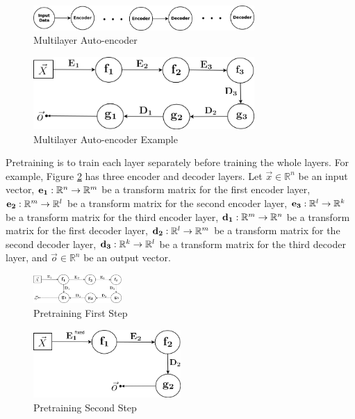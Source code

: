 \documentclass[draft,dvipsnames]{drexel-thesis}
\begin{document}
\begin{thesis}
\begin{figure}[t!]
    \centering
    \includegraphics[width=0.75\textwidth]{pictures/figures/MAE.png}
    \caption{Multilayer Auto-encoder}
    \label{fig:MAE}
\end{figure}

\begin{figure}[t!]
    \centering
    \includegraphics[width=0.75\textwidth]{pictures/figures/example_MAE.png}
    \caption{Multilayer Auto-encoder Example}
    \label{fig:example_MAE}
\end{figure}

	Pretraining is to train each layer separately before training the whole layers. For example, Figure \ref{fig:example_MAE} has three encoder and decoder layers. Let $\vec{x} \in \mathbb{R}^n$ be an input vector, $\bold{e_1}: \mathbb{R}^n \rightarrow \mathbb{R}^m$ be a transform matrix for the first encoder layer, $\bold{e_2}: \mathbb{R}^m \rightarrow \mathbb{R}^l$ be a transform matrix for the second encoder layer, $\bold{e_3}: \mathbb{R}^l \rightarrow \mathbb{R}^k$ be a transform matrix for the third encoder layer, $\bold{d_1}: \mathbb{R}^m \rightarrow \mathbb{R}^n$ be a transform matrix for the first decoder layer, $\bold{d_2}: \mathbb{R}^l \rightarrow \mathbb{R}^m$ be a transform matrix for the second decoder layer, $\bold{d_3}: \mathbb{R}^k \rightarrow \mathbb{R}^l$ be a transform matrix for the third decoder layer, and $\vec{o} \in \mathbb{R}^n$ be an output vector.

\begin{figure}[t!]
    \centering
    \includegraphics[width=0.3\textwidth]{pictures/figures/train_MAE1.png}
    \caption{Pretraining First Step}
    \label{fig:train_MAE1}
\end{figure}

\begin{figure}[t!]
    \centering
    \includegraphics[width=0.5\textwidth]{pictures/figures/train_MAE2.png}
    \caption{Pretraining Second Step}
    \label{fig:train_MAE2}
\end{figure}


\end{thesis}
\end{document}
